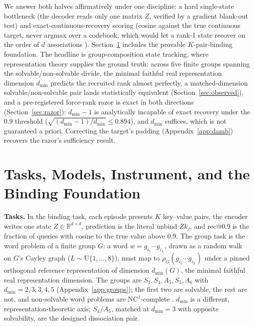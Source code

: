 \documentclass[mlabstract,onecolumn]{jmlr}
\makeatletter
\newcommand{\R}{\mathbb{R}}
\newcommand{\dmin}{d_{\min}}
\newcommand{\recninety}{\mathrm{rec}@0.9}
\makeatother
\begin{document}
We answer both halves affirmatively under one discipline: a hard
single-state bottleneck (the decoder reads only one matrix $Z$, verified
by a gradient blank-out test) and exact-continuous-recovery scoring
(cosine against the true continuous target, never argmax over a codebook,
which would let a rank-1 state recover on the order of $d$ associations
\citep{nichani2025factual}). Section~\ref{sec:setup} includes the
provable $K$-pair-binding foundation. The headline is
group-composition state tracking, where representation theory
supplies the ground truth: across five finite groups spanning the
solvable/non-solvable divide, the minimal faithful real representation
dimension $\dmin$ predicts the recruited rank almost perfectly, a
matched-dimension solvable/non-solvable pair lands statistically
equivalent (Section~\ref{sec:observed}),
and a pre-registered force-rank
razor is exact in both directions (Section~\ref{sec:razor}): $\dmin{-}1$
is analytically incapable of exact recovery under the $0.9$ threshold
($\sqrt{(\dmin{-}1)/\dmin} \le 0.894$), and $\dmin$ suffices, which is not
guaranteed a priori.
Correcting the target's padding (Appendix~\ref{app:damb}) recovers the
razor's sufficiency result.

\section{Tasks, Models, Instrument, and the Binding Foundation}
\label{sec:setup}

\textbf{Tasks.} In the binding task, each episode presents $K$
key--value pairs, the encoder writes one state $Z \in \R^{d \times d}$,
prediction is the literal unbind $Z k_j$, and $\recninety$ is the
fraction of queries with cosine to the true value above 0.9. The group
task is the word problem of a finite group $G$: a word
$w = g_{i_1} \cdots g_{i_L}$, drawn as a random walk on $G$'s Cayley
graph ($L \sim \mathrm{U}\{1,\dots,8\}$), must map to
$\rho_G(g_{i_1} \cdots g_{i_L})$ under a pinned orthogonal reference
representation of dimension $\dmin(G)$, the minimal faithful real
representation dimension. The groups are $S_3, S_4, A_5, S_5, A_6$ with
$\dmin = 2, 3, 3, 4, 5$ (Appendix~\ref{app:groups}); the first two are
solvable, the rest are not, and non-solvable word problems are
$\mathrm{NC}^1$-complete \citep{barrington1989,barringtontherien1988}.
$\dmin$ is a different,
representation-theoretic axis; $S_4$/$A_5$, matched at $\dmin = 3$ with
opposite solvability, are the designed dissociation pair.
\end{document}
